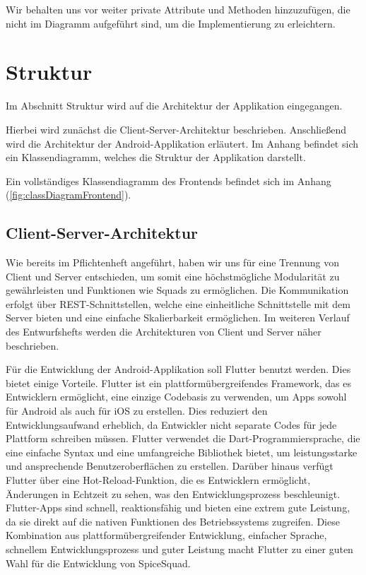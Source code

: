 \documentclass{entwurfsheft}
\begin{document}
\begin{sloppypar}
Wir behalten uns vor weiter private Attribute und Methoden hinzuzufügen, die nicht im Diagramm aufgeführt sind, um die Implementierung zu erleichtern.
\newpage
\section{Struktur}
Im Abschnitt Struktur wird auf die Architektur der Applikation eingegangen.

Hierbei wird zunächst die Client-Server-Architektur beschrieben.
Anschließend wird die Architektur der Android-Applikation erläutert.
Im Anhang befindet sich ein Klassendiagramm, welches die Struktur der Applikation darstellt. 

Ein vollständiges Klassendiagramm des Frontends befindet sich im Anhang (\autoref{fig:classDiagramFrontend}).

\subsection{Client-Server-Architektur}
Wie bereits im Pflichtenheft angeführt, haben wir uns für eine Trennung von Client und Server entschieden, um somit eine höchstmögliche Modularität zu gewährleisten und
Funktionen wie Squads zu ermöglichen. Die Kommunikation erfolgt über REST-Schnittstellen, welche eine einheitliche Schnittstelle mit dem Server bieten und eine einfache Skalierbarkeit ermöglichen.
Im weiteren Verlauf des Entwurfshefts werden die Architekturen von Client und Server näher beschrieben.

Für die Entwicklung der Android-Applikation soll Flutter benutzt werden. Dies bietet einige Vorteile. Flutter ist ein plattformübergreifendes Framework, das es Entwicklern ermöglicht, eine einzige Codebasis zu verwenden, um Apps sowohl für Android als auch für iOS zu erstellen. Dies reduziert den Entwicklungsaufwand erheblich, da Entwickler nicht separate Codes für jede Plattform schreiben müssen. Flutter verwendet die Dart-Programmiersprache, die eine einfache Syntax und eine umfangreiche Bibliothek bietet, um leistungsstarke und ansprechende Benutzeroberflächen zu erstellen. Darüber hinaus verfügt Flutter über eine Hot-Reload-Funktion, die es Entwicklern ermöglicht, Änderungen in Echtzeit zu sehen, was den Entwicklungsprozess beschleunigt. Flutter-Apps sind schnell, reaktionsfähig und bieten eine extrem gute Leistung, da sie direkt auf die nativen Funktionen des Betriebssystems zugreifen. Diese Kombination aus plattformübergreifender Entwicklung, einfacher Sprache, schnellem Entwicklungsprozess und guter Leistung macht Flutter zu einer guten Wahl für die Entwicklung von SpiceSquad.
\newpage

\end{sloppypar}
\end{document}
